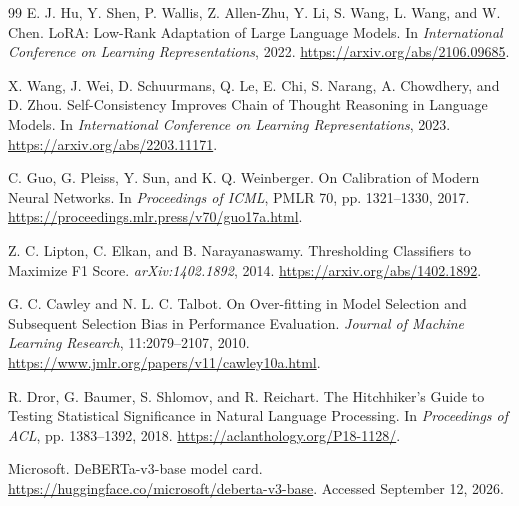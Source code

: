 \documentclass[12pt,a4paper]{article}
\begin{document}
\begin{thebibliography}{99}
E. J. Hu, Y. Shen, P. Wallis, Z. Allen-Zhu, Y. Li, S. Wang, L. Wang, and W. Chen.
LoRA: Low-Rank Adaptation of Large Language Models.
In \emph{International Conference on Learning Representations}, 2022.
\url{https://arxiv.org/abs/2106.09685}.

X. Wang, J. Wei, D. Schuurmans, Q. Le, E. Chi, S. Narang, A. Chowdhery, and D. Zhou.
Self-Consistency Improves Chain of Thought Reasoning in Language Models.
In \emph{International Conference on Learning Representations}, 2023.
\url{https://arxiv.org/abs/2203.11171}.

C. Guo, G. Pleiss, Y. Sun, and K. Q. Weinberger.
On Calibration of Modern Neural Networks.
In \emph{Proceedings of ICML}, PMLR 70, pp. 1321--1330, 2017.
\url{https://proceedings.mlr.press/v70/guo17a.html}.

Z. C. Lipton, C. Elkan, and B. Narayanaswamy.
Thresholding Classifiers to Maximize F1 Score.
\emph{arXiv:1402.1892}, 2014.
\url{https://arxiv.org/abs/1402.1892}.

G. C. Cawley and N. L. C. Talbot.
On Over-fitting in Model Selection and Subsequent Selection Bias in Performance Evaluation.
\emph{Journal of Machine Learning Research}, 11:2079--2107, 2010.
\url{https://www.jmlr.org/papers/v11/cawley10a.html}.

R. Dror, G. Baumer, S. Shlomov, and R. Reichart.
The Hitchhiker's Guide to Testing Statistical Significance in Natural Language Processing.
In \emph{Proceedings of ACL}, pp. 1383--1392, 2018.
\url{https://aclanthology.org/P18-1128/}.

Microsoft.
DeBERTa-v3-base model card.
\url{https://huggingface.co/microsoft/deberta-v3-base}.
Accessed September 12, 2026.
\end{thebibliography}
\end{document}
